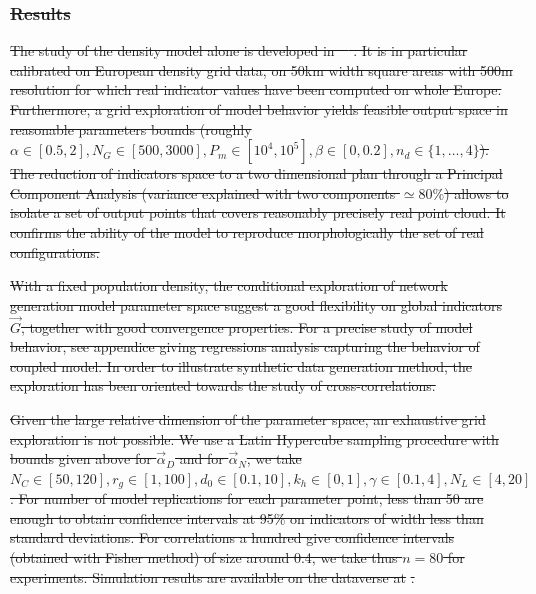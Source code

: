 \documentclass{bmcart}
\providecommand{\DIFdeltex}[1]{{\protect\color{red}\sout{#1}}}                      %
\providecommand{\DIFdel}[1]{\texorpdfstring{\DIFdeltex{#1}}{}} %
\begin{document}
\subsubsection*{\DIFdel{Results}}

\DIFdel{The study of the density model alone is developed in~\mbox{%
\cite{raimbault2018calibration}}%
. It is in particular calibrated on European density grid data, on 50km width square areas with 500m resolution for which real indicator values have been computed on whole Europe. Furthermore, a grid exploration of model behavior yields feasible output space in reasonable parameters bounds (roughly $\alpha \in [0.5,2],N_G\in [500,3000], P_m \in [10^4,10^5],\beta\in [0,0.2], n_d \in \{ 1, \ldots , 4\}$). The reduction of indicators space to a two dimensional plan through a Principal Component Analysis (variance explained with two components $\simeq 80\%$) allows to isolate a set of output points that covers reasonably precisely real point cloud. It confirms the ability of the model to reproduce morphologically the set of real configurations.
}%

\DIFdel{With a fixed population density, the conditional exploration of network generation model parameter space suggest a good flexibility on global indicators $\vec{G}$, together with good convergence properties. For a precise study of model behavior, see appendice giving regressions analysis capturing the behavior of coupled model. In order to illustrate synthetic data generation method, the exploration has been oriented towards the study of cross-correlations.
}%

\DIFdel{Given the large relative dimension of the parameter space, an exhaustive grid exploration is not possible. We use a Latin Hypercube sampling procedure with bounds given above for $\vec{\alpha}_D$ and for $\vec{\alpha}_N$, we take $N_C \in [50,120], r_g \in [1,100] , d_0 \in [0.1,10] , k_h \in [0,1] , \gamma \in [0.1,4],N_L\in [4,20]$. For number of model replications for each parameter point, less than 50 are enough to obtain confidence intervals at 95\% on indicators of width less than standard deviations. For correlations a hundred give confidence intervals (obtained with Fisher method) of size around 0.4, we take thus $n=80$ for experiments. Simulation results are available on the dataverse at }%
\DIFdel{.
}%
\end{document}
